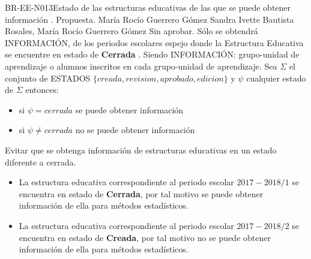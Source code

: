 \begin{BusinessRule}{BR-EE-N013}{Estado de las estructuras educativas de las que se puede obtener información}
	{\bcCondition}    %
	{\btEnabler}     %
	{\blControlling}    %
	.
	\BRItem[Estado] Propuesta.
	 María Rocío Guerrero Gómez
	 Sandra Ivette Bautista Rosales, María Rocío Guerrero Gómez
	 Sin aprobar.
	\BRItem[Descripción] Sólo se obtendrá INFORMACIÓN, de los periodos escolares espejo donde la Estructura Educativa se encuentre en estado de \textbf{Cerrada} . Siendo INFORMACIÓN: grupo-unidad de aprendizaje o alumnos inscritos en cada grupo-unidad de aprendizaje.
	\BRItem[Sentencia] Sea $\Sigma$ el conjunto de ESTADOS $\{creada,revision,aprobado,edicion\}$  y $\psi$ cualquier estado de  $\Sigma$  entonces: \\
	\begin{itemize}
		\item si $\psi = cerrada$ se puede obtener información
		\item si $\psi \neq cerrada$  no se puede obtener información
	\end{itemize}	
	\BRItem[Motivación] Evitar que se obtenga información de estructuras educativas en un estado diferente a cerrada.
		 \cdtEmpty
		\begin{itemize}
			\item La estructura educativa correspondiente al periodo escolar $2017-2018/1$ se encuentra en estado de \textbf{Cerrada}, por tal motivo se puede obtener información de ella para métodos estadísticos.
		\end{itemize}
		 \cdtEmpty
		\begin{itemize}
			\item La estructura educativa correspondiente al periodo escolar $2017-2018/2$ se encuentra en estado de \textbf{Creada}, por tal motivo no se puede obtener información de ella para métodos estadísticos.
		\end{itemize}
\end{BusinessRule}

